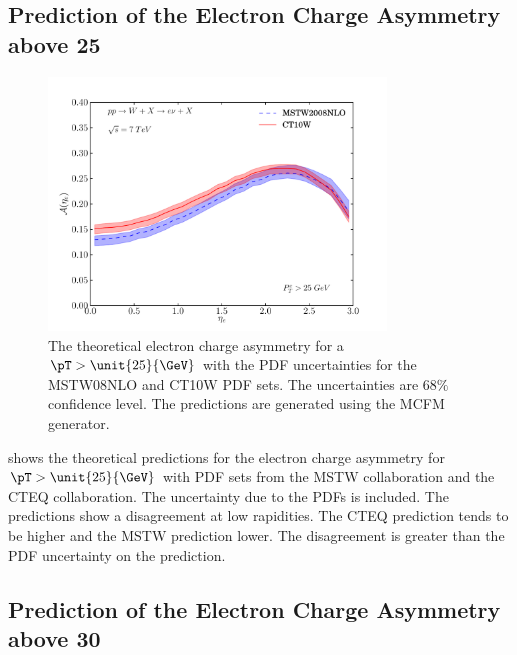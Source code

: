 \subsection{Prediction of the Electron Charge Asymmetry above \unit{25}{\GeV}}

\begin{figure}[htbp]
  \centering
  \includegraphics[width=0.8\textwidth]{asym-uncert}
  \caption[The theoretical electron charge asymmetry for a ${\pT>\unit{25}{\GeV}}$
with the {PDF} uncertainties.] {The theoretical electron charge
asymmetry\cite{monchenault2011predictions} for a $\pT>\unit{25}{\GeV}$ with the
{PDF} uncertainties for the MSTW08NLO\cite{martin2009parton} and
CT10W\cite{lai2010vv} {PDF} sets. The uncertainties are $68\%$ confidence level. The
predictions are generated using the {MCFM} \cite{campbellmcfm} generator.}
  \label{fig:asym-uncert}
\end{figure}

 shows the theoretical predictions for the electron
charge asymmetry for $\pT>\unit{25}{\GeV}$ with PDF sets from the MSTW
collaboration\cite{martin2009parton} and the CTEQ collaboration\cite{lai2010vv}.
The uncertainty due to the PDFs is included.  The predictions show a
disagreement at low rapidities. The CTEQ prediction tends to be higher and the
MSTW prediction lower. The disagreement is greater than the PDF uncertainty on
the prediction.

\subsection{Prediction of the Electron Charge Asymmetry above \unit{30}{\GeV}}

